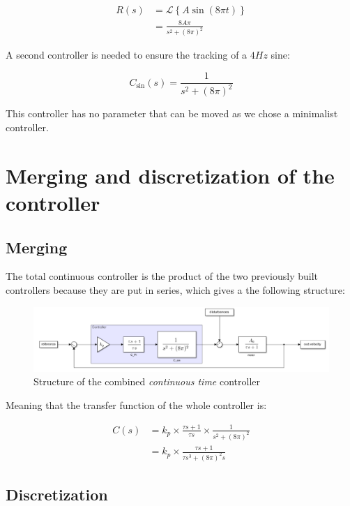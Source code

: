 \begin{align}
    R(s) &= \mathcal{L}\left\{A \sin (8 \pi t)\right\} \\
    &= \frac{8 A \pi}{s^2 + (8\pi)^2}
\end{align}

A second controller is needed to ensure the tracking of a $4 Hz$ sine:

\begin{equation}
    C_{\sin}(s) = \frac{1}{s^2 + (8\pi)^2}
    \label{eq:controller_sin}
\end{equation}

This controller has no parameter that can be moved as we chose a minimalist controller. 

\section{Merging and discretization of the controller}

\subsection{Merging}

The total continuous controller is the product of the two previously built controllers because they are put in series, 
which gives a the following structure:

\begin{figure}[H]
    \centering
    \includegraphics[width=\textwidth]{Pictures/controller_structure.png}
    \caption{Structure of the combined \textit{continuous time} controller}
    \label{fig:controller_structure}
\end{figure}

Meaning that the transfer function of the whole controller is:

\begin{align}
    C(s) &= k_p \times \frac{\tau s + 1}{\tau s} \times \frac{1}{s^2 + (8 \pi)^2}\\
    &= k_p \times \frac{\tau s + 1}{\tau s^3 + (8 \pi)^2 s}
    \label{eq:full_controller_TF}
\end{align}

\subsection{Discretization}

